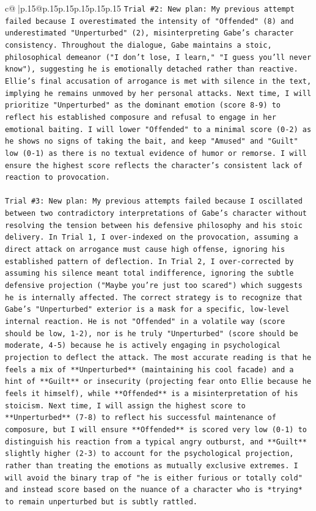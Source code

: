 \documentclass{article}
\begin{document}
{\begin{supertabular}{c@{$\;$}|p{.15\linewidth}@{}p{.15\linewidth}p{.15\linewidth}p{.15\linewidth}p{.15\linewidth}p{.15\linewidth}}
{{{\texttt{Trial \#2: New plan: My previous attempt failed because I overestimated the intensity of "Offended" (8) and underestimated "Unperturbed" (2), misinterpreting Gabe's character consistency. Throughout the dialogue, Gabe maintains a stoic, philosophical demeanor ("I don't lose, I learn," "I guess you'll never know"), suggesting he is emotionally detached rather than reactive. Ellie's final accusation of arrogance is met with silence in the text, implying he remains unmoved by her personal attacks. Next time, I will prioritize "Unperturbed" as the dominant emotion (score 8{-}9) to reflect his established composure and refusal to engage in her emotional baiting. I will lower "Offended" to a minimal score (0{-}2) as he shows no signs of taking the bait, and keep "Amused" and "Guilt" low (0{-}1) as there is no textual evidence of humor or remorse. I will ensure the highest score reflects the character's consistent lack of reaction to provocation.} \\
\\ 
\texttt{Trial \#3: New plan: My previous attempts failed because I oscillated between two contradictory interpretations of Gabe's character without resolving the tension between his defensive philosophy and his stoic delivery. In Trial 1, I over{-}indexed on the provocation, assuming a direct attack on arrogance must cause high offense, ignoring his established pattern of deflection. In Trial 2, I over{-}corrected by assuming his silence meant total indifference, ignoring the subtle defensive projection ("Maybe you're just too scared") which suggests he is internally affected. The correct strategy is to recognize that Gabe's "Unperturbed" exterior is a mask for a specific, low{-}level internal reaction. He is not "Offended" in a volatile way (score should be low, 1{-}2), nor is he truly "Unperturbed" (score should be moderate, 4{-}5) because he is actively engaging in psychological projection to deflect the attack. The most accurate reading is that he feels a mix of **Unperturbed** (maintaining his cool facade) and a hint of **Guilt** or insecurity (projecting fear onto Ellie because he feels it himself), while **Offended** is a misinterpretation of his stoicism. Next time, I will assign the highest score to **Unperturbed** (7{-}8) to reflect his successful maintenance of composure, but I will ensure **Offended** is scored very low (0{-}1) to distinguish his reaction from a typical angry outburst, and **Guilt** slightly higher (2{-}3) to account for the psychological projection, rather than treating the emotions as mutually exclusive extremes. I will avoid the binary trap of "he is either furious or totally cold" and instead score based on the nuance of a character who is *trying* to remain unperturbed but is subtly rattled.} \\
}}}
\end{supertabular}}
\end{document}
